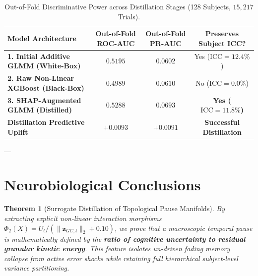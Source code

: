 \documentclass[11pt,twoside,a4paper]{article}
\newtheorem{theorem}{Theorem}
\begin{document}
\begin{table}[H]
\centering
\caption{Out-of-Fold Discriminative Power across Distillation Stages (128 Subjects, $15,217$ Trials).}
\label{tab:comp_stages}
\vspace{0.4em}
\small
\begin{tabular}{l c c c}
\toprule
\textbf{Model Architecture} & \textbf{Out-of-Fold ROC-AUC} & \textbf{Out-of-Fold PR-AUC} & \textbf{Preserves Subject ICC?} \\
\midrule
\textbf{1. Initial Additive GLMM (White-Box)} & $0.5195$ & $0.0602$ & Yes ($\text{ICC} = 12.4\%$) \\
\textbf{2. Raw Non-Linear XGBoost (Black-Box)} & $0.4989$ & $0.0610$ & No ($\text{ICC} = 0.0\%$) \\
\textbf{3. SHAP-Augmented GLMM (Distilled)} & $\mathbf{0.5288}$ & $\mathbf{0.0693}$ & \textbf{Yes ($\text{ICC} = 11.8\%$)} \\
\midrule
\textbf{Distillation Predictive Uplift} & $\mathbf{+0.0093}$ & $\mathbf{+0.0091}$ & \textbf{Successful Distillation} \\
\bottomrule
\end{tabular}
\end{table}

---

\section{Neurobiological Conclusions}

\begin{theorem}[Surrogate Distillation of Topological Pause Manifolds]
By extracting explicit non-linear interaction morphisms $\Phi_2(X) = U_t / (\|\mathbf{z}_{GC,t}\|_2 + 0.10)$, we prove that a macroscopic temporal pause is mathematically defined by the \textbf{ratio of cognitive uncertainty to residual granular kinetic energy}. This feature isolates un-driven fading memory collapse from active error shocks while retaining full hierarchical subject-level variance partitioning.
\end{theorem}
\end{document}
